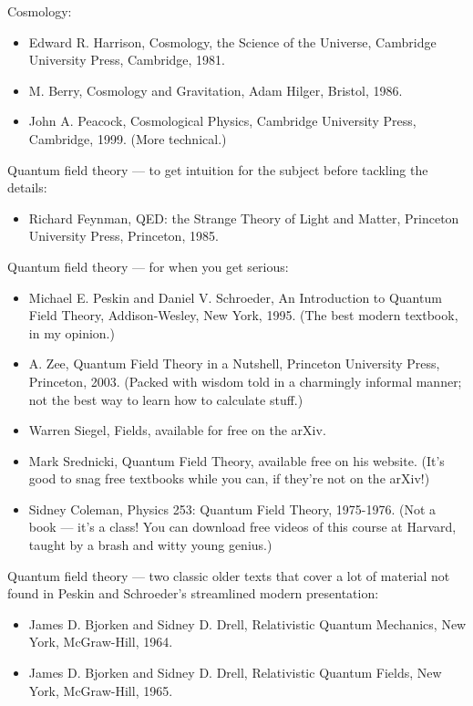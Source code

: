 \documentclass[10pt,a4paper]{book}
\theoremstyle{definition}
\begin{document}
Cosmology:
\begin{itemize}
\item  Edward R. Harrison, Cosmology, the Science of the Universe, Cambridge University Press, Cambridge, 1981.
\item M. Berry, Cosmology and Gravitation, Adam Hilger, Bristol, 1986.
\item John A. Peacock, Cosmological Physics, Cambridge University Press, Cambridge, 1999. (More technical.)
\end{itemize}

Quantum field theory — to get intuition for the subject before tackling the details:
\begin{itemize}
\item  Richard Feynman, QED: the Strange Theory of Light and Matter, Princeton University Press, Princeton, 1985.
\end{itemize}

Quantum field theory — for when you get serious:
\begin{itemize}
\item  Michael E. Peskin and Daniel V. Schroeder, An Introduction to Quantum Field Theory, Addison-Wesley, New York, 1995. (The best modern textbook, in my opinion.)
\item A. Zee, Quantum Field Theory in a Nutshell, Princeton University Press, Princeton, 2003. (Packed with wisdom told in a charmingly informal manner; not the best way to learn how to calculate stuff.)
\item Warren Siegel, Fields, available for free on the arXiv.
\item Mark Srednicki, Quantum Field Theory, available free on his website. (It's good to snag free textbooks while you can, if they're not on the arXiv!)
\item Sidney Coleman, Physics 253: Quantum Field Theory, 1975-1976. (Not a book — it's a class! You can download free videos of this course at Harvard, taught by a brash and witty young genius.)
\end{itemize}

Quantum field theory — two classic older texts that cover a lot of material not found in Peskin and Schroeder's streamlined modern presentation:
\begin{itemize}
\item  James D. Bjorken and Sidney D. Drell, Relativistic Quantum Mechanics, New York, McGraw-Hill, 1964.
\item James D. Bjorken and Sidney D. Drell, Relativistic Quantum Fields, New York, McGraw-Hill, 1965.
\end{itemize}
\end{document}
